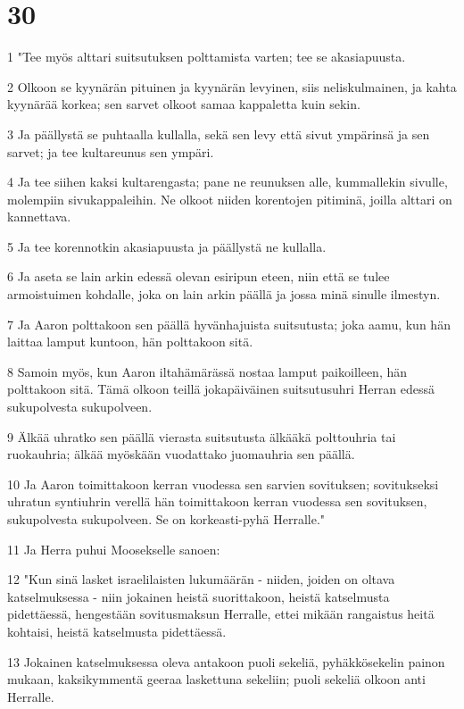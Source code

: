 \chapter{30}

\par 1 "Tee myös alttari suitsutuksen polttamista varten; tee se akasiapuusta.
\par 2 Olkoon se kyynärän pituinen ja kyynärän levyinen, siis neliskulmainen, ja kahta kyynärää korkea; sen sarvet olkoot samaa kappaletta kuin sekin.
\par 3 Ja päällystä se puhtaalla kullalla, sekä sen levy että sivut ympärinsä ja sen sarvet; ja tee kultareunus sen ympäri.
\par 4 Ja tee siihen kaksi kultarengasta; pane ne reunuksen alle, kummallekin sivulle, molempiin sivukappaleihin. Ne olkoot niiden korentojen pitiminä, joilla alttari on kannettava.
\par 5 Ja tee korennotkin akasiapuusta ja päällystä ne kullalla.
\par 6 Ja aseta se lain arkin edessä olevan esiripun eteen, niin että se tulee armoistuimen kohdalle, joka on lain arkin päällä ja jossa minä sinulle ilmestyn.
\par 7 Ja Aaron polttakoon sen päällä hyvänhajuista suitsutusta; joka aamu, kun hän laittaa lamput kuntoon, hän polttakoon sitä.
\par 8 Samoin myös, kun Aaron iltahämärässä nostaa lamput paikoilleen, hän polttakoon sitä. Tämä olkoon teillä jokapäiväinen suitsutusuhri Herran edessä sukupolvesta sukupolveen.
\par 9 Älkää uhratko sen päällä vierasta suitsutusta älkääkä polttouhria tai ruokauhria; älkää myöskään vuodattako juomauhria sen päällä.
\par 10 Ja Aaron toimittakoon kerran vuodessa sen sarvien sovituksen; sovitukseksi uhratun syntiuhrin verellä hän toimittakoon kerran vuodessa sen sovituksen, sukupolvesta sukupolveen. Se on korkeasti-pyhä Herralle."
\par 11 Ja Herra puhui Moosekselle sanoen:
\par 12 "Kun sinä lasket israelilaisten lukumäärän - niiden, joiden on oltava katselmuksessa - niin jokainen heistä suorittakoon, heistä katselmusta pidettäessä, hengestään sovitusmaksun Herralle, ettei mikään rangaistus heitä kohtaisi, heistä katselmusta pidettäessä.
\par 13 Jokainen katselmuksessa oleva antakoon puoli sekeliä, pyhäkkösekelin painon mukaan, kaksikymmentä geeraa laskettuna sekeliin; puoli sekeliä olkoon anti Herralle.
